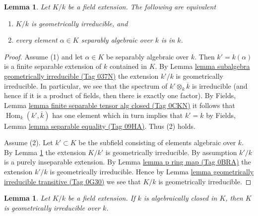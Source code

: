 \documentclass{amsart}
\theoremstyle{plain}
\newtheorem{lemma}[subsection]{Lemma}
\theoremstyle{definition}
\theoremstyle{remark}
\numberwithin{equation}{subsection}
\def\Hom{\mathop{\mathrm{Hom}}\nolimits}
\begin{document}
\begin{lemma}
\label{algebra-lemma-geometrically-irreducible-separable-elements}
Let $K/k$ be a field extension. The following are equivalent
\begin{enumerate}
\item $K/k$ is geometrically irreducible, and
\item every element $\alpha \in K$ separably algebraic over $k$ is
in $k$.
\end{enumerate}
\end{lemma}

\begin{proof}
Assume (1) and let $\alpha \in K$ be separably algebraic over $k$.
Then $k' = k(\alpha)$ is a finite separable extension of $k$ contained
in $K$. By Lemma \href{https://stacks.math.columbia.edu/tag/037N}{lemma subalgebra geometrically irreducible (Tag 037N)}
the extension $k'/k$ is geometrically irreducible.
In particular, we see that the spectrum of $k' \otimes_k \overline{k}$
is irreducible (and hence if it is a product of fields, then there
is exactly one factor).
By Fields, Lemma \href{https://stacks.math.columbia.edu/tag/0CKN}{lemma finite separable tensor alg closed (Tag 0CKN)}
it follows that $\Hom_k(k', \overline{k})$ has one element which in turn
implies that $k' = k$ by
Fields, Lemma \href{https://stacks.math.columbia.edu/tag/09HA}{lemma separable equality (Tag 09HA)}.
Thus (2) holds.

\medskip\noindent
Assume (2). Let $k' \subset K$ be the subfield consisting of elements
algebraic over $k$. By
Lemma \ref{algebra-lemma-field-extension-geometrically-irreducible}
the extension $K/k'$ is geometrically irreducible.
By assumption $k'/k$ is a purely inseparable extension.
By Lemma \href{https://stacks.math.columbia.edu/tag/0BRA}{lemma p ring map (Tag 0BRA)} the extension
$k'/k$ is geometrically irreducible. Hence by
Lemma \href{https://stacks.math.columbia.edu/tag/0G30}{lemma geometrically irreducible transitive (Tag 0G30)}
we see that $K/k$ is geometrically irreducible.
\end{proof}


\begin{lemma}
\label{algebra-lemma-field-extension-geometrically-irreducible}
Let $K/k$ be a field extension. If $k$ is algebraically closed in $K$, then
$K$ is geometrically irreducible over $k$.
\end{lemma}
\end{document}

